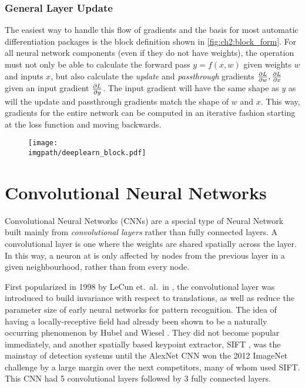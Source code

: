 \subsubsection{General Layer Update}
The easiest way to handle this flow of gradients and the basis for most
automatic differentiation packages is the block definition shown in
\autoref{fig:ch2:block_form}. For all neural network components (even if they do
not have weights), the operation must not only be able to calculate the forward
pass $y=f(x, w)$ given weights $w$ and inputs $x$, but also calculate the
\emph{update} and \emph{passthrough} gradients $\frac{\partial L}{\partial w}, \frac{\partial L}{\partial x}$ given
an input gradient $\frac{\partial L}{\partial y}$. The input gradient will have the same shape as
$y$ as will the update and passthrough gradients match the shape of $w$ and $x$.
This way, gradients for the entire network can be computed in an iterative
fashion starting at the loss function and moving backwards.

\begin{figure}
  \centering
  \texttt{[image: \\imgpath/deeplearn\_block.pdf]}
  \label{fig:ch2:block_form}
\end{figure}

\section{Convolutional Neural Networks}\label{sec:ch2:cnns}
Convolutional Neural Networks (CNNs) are a special type of Neural Network built mainly from
\emph{convolutional layers} rather than fully connected layers. A convolutional
layer is one where the weights are shared spatially across the layer.
In this way, a neuron at is only affected by
nodes from the previous layer in a given neighbourhood, rather than from every node.

First popularized in 1998 by LeCun et.\ al.\ in \cite{lecun_gradient-based_1998},
the convolutional layer was introduced to build invariance with respect to
translations, as well as reduce the parameter size of early neural networks for
pattern recognition. The idea of having a locally-receptive field had already
been shown to be a naturally occurring phenomenon by Hubel and Wiesel
\cite{hubel_receptive_1962}. They did not become popular immediately, and
another spatially based keypoint extractor, SIFT \cite{lowe_distinctive_2004},
was the mainstay of detection systems until the AlexNet CNN
\cite{krizhevsky_imagenet_2012} won the 2012 ImageNet challenge
\cite{russakovsky_imagenet_2015-1} by a large margin over the next competitors, many of
whom used SIFT\@. This CNN had 5 convolutional layers followed by 3 fully
connected layers.


